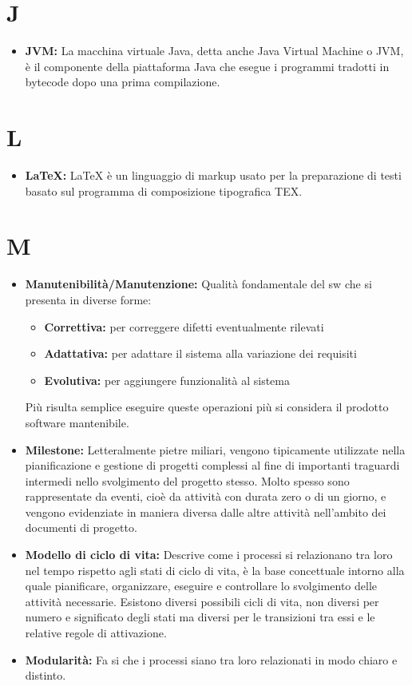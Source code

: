 \documentclass[a4paper]{report}
\newcommand{\mychapter}[2]{
	\setcounter{chapter}{#1}
	\setcounter{section}{0}
	\setcounter{subsection}{1}
	\chapter*{#2}
	\addcontentsline{toc}{chapter}{#2}
}
\begin{document}
	\mychapter{9}{J}	
	\begin{itemize}
		\item \textbf{JVM:} La macchina virtuale Java, detta anche Java Virtual Machine o JVM, è il componente della piattaforma
		 Java che esegue i programmi tradotti in bytecode dopo una prima compilazione.
	\end{itemize}
	
	\mychapter{10}{L}
	\begin{itemize}
		\item \textbf{LaTeX:} LaTeX  è un linguaggio di markup usato per la preparazione di testi basato sul programma di
		 composizione tipografica TEX.
	\end{itemize}
		
	\mychapter{11}{M}
		\begin{itemize}
			\item \textbf{Manutenibilità/Manutenzione:} Qualità fondamentale del sw che si presenta in diverse forme:
			\begin{itemize}
				\item  \textbf{Correttiva:} per correggere difetti eventualmente rilevati
			  	\item  \textbf{Adattativa:} per adattare il sistema alla variazione dei requisiti
			  	\item  \textbf{Evolutiva:} per aggiungere funzionalità al sistema
			\end{itemize}
			Più risulta semplice eseguire queste operazioni più si considera il prodotto software mantenibile.
			\item \textbf{Milestone:} Letteralmente pietre miliari, vengono tipicamente utilizzate nella pianificazione 
			e gestione di progetti complessi al fine di importanti traguardi intermedi nello svolgimento del progetto stesso. 
			Molto spesso sono rappresentate da eventi, cioè da attività con durata zero o di un giorno, e vengono evidenziate 
			in maniera diversa dalle altre attività nell’ambito dei documenti di progetto.
			\item \textbf{Modello di ciclo di vita:} Descrive come i processi si relazionano tra loro nel tempo rispetto agli 
			stati di ciclo di vita, è la base concettuale intorno alla quale pianificare, organizzare, eseguire e controllare 
			lo svolgimento delle attività necessarie. Esistono diversi possibili cicli di vita, non diversi per numero e significato 
			degli stati ma diversi per le transizioni tra essi e le relative regole di attivazione.
			\item \textbf{Modularità:} Fa si che i processi siano tra loro relazionati in modo chiaro e distinto.		
		\end{itemize}
		
\end{document}
